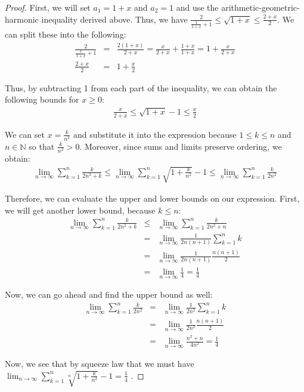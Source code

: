 \documentclass[psamsfonts]{amsart}
\theoremstyle{definition}
\theoremstyle{remark}
\numberwithin{equation}{section}
\begin{document}
\begin{proof}
First, we will set $a_1 = 1+ x$ and $a_2 = 1$ and use the arithmetic-geometric-harmonic inequality derived above. Thus, we have $\frac{2}{\frac{1}{1+x} + 1} \leq \sqrt{1+x} \leq \frac{2+ x}{2}$. We can split these into the following:
\begin{eqnarray}
\frac{2}{\frac{1}{1+x} + 1} &=& \frac{2(1+x)}{2+x} = \frac{x}{2+x} + \frac{1+x}{1+x} = 1 + \frac{x}{2+x} \\
\frac{2+x}{2} &=& 1+ \frac{x}{2} 
\end{eqnarray}

Thus, by subtracting 1 from each part of the inequality, we can obtain the following bounds for $x \geq 0$:
\begin{eqnarray}
\frac{x}{2+x} \leq \sqrt{1 + x} - 1 \leq \frac{x}{2}
\end{eqnarray}

We can set $x = \frac{k}{n^2}$ and substitute it into the expression because $1 \leq k \leq n$ and $n \in \mathbb{N}$ so that $\frac{k}{n^2} >0$. Moreover, since sums and limits preserve ordering, we obtain:
\begin{eqnarray}
\lim_{n \to \infty} \sum_{k=1}^n \frac{k}{2 n^2 + k} \leq  \lim_{n \to \infty} \sum_{k=1}^n  \sqrt{1 + \frac{k}{n^2}} - 1 \leq \lim_{n \to \infty} \sum_{k=1}^n  \frac{k}{2n^2} 
\end{eqnarray}

Therefore, we can evaluate the upper and lower bounds on our expression. First, we will get another lower bound, because $k \leq n$:
\begin{eqnarray}
\lim_{n \to \infty} \sum_{k=1}^n \frac{k}{2n^2 + k} &\leq& \lim_{n \to \infty} \sum_{k=1}^n \frac{k}{2n^2 + n} \\
&=& \lim_{n \to \infty} \frac{1}{2n (n+1)} \sum_{k=1}^n k \\
&=& \lim_{n \to \infty} \frac{1}{2n (n+1)} \frac{n(n+1)}{2} \\
&=& \lim_{n \to \infty} \frac{1}{4} = \frac{1}{4}
\end{eqnarray}

Now, we can go ahead and find the upper bound as well:
\begin{eqnarray}
\lim_{n \to \infty} \sum_{k=1}^n \frac{k}{2n^2} &=& \lim_{n \to \infty} \frac{1}{2n^2} \sum_{k=1}^n k \\
&=& \lim_{n \to \infty} \frac{1}{2n^2} \frac{n(n+1)}{2} \\
&=& \lim_{n \to \infty} \frac{n^2 + n}{4 n^2} = \frac{1}{4} 
\end{eqnarray}

Now, we see that by squeeze law that we must have $\lim_{n \to \infty} \sum_{k=1}^n \sqrt[n]{1 + \frac{k}{n^2}} - 1 = \frac{1}{4}$ . 
\end{proof}
\end{document}
